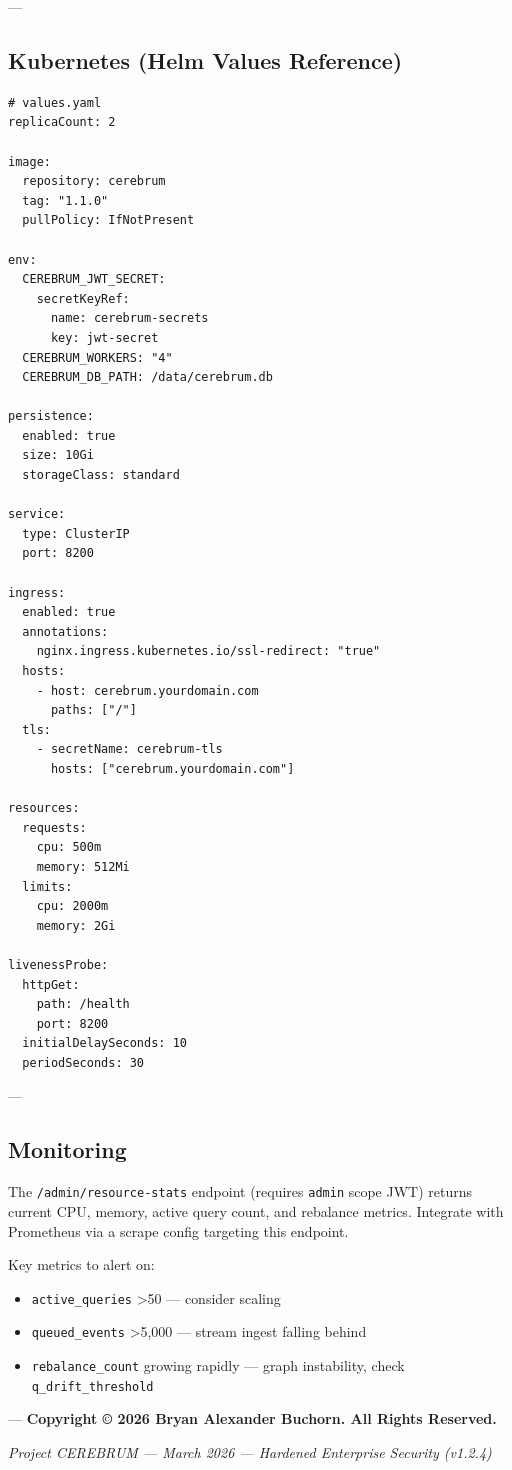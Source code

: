 \documentclass[11pt,article,oneside]{memoir}
\begin{document}
---

\subsection{Kubernetes (Helm Values Reference)}

\begin{lstlisting}
# values.yaml
replicaCount: 2

image:
  repository: cerebrum
  tag: "1.1.0"
  pullPolicy: IfNotPresent

env:
  CEREBRUM_JWT_SECRET:
    secretKeyRef:
      name: cerebrum-secrets
      key: jwt-secret
  CEREBRUM_WORKERS: "4"
  CEREBRUM_DB_PATH: /data/cerebrum.db

persistence:
  enabled: true
  size: 10Gi
  storageClass: standard

service:
  type: ClusterIP
  port: 8200

ingress:
  enabled: true
  annotations:
    nginx.ingress.kubernetes.io/ssl-redirect: "true"
  hosts:
    - host: cerebrum.yourdomain.com
      paths: ["/"]
  tls:
    - secretName: cerebrum-tls
      hosts: ["cerebrum.yourdomain.com"]

resources:
  requests:
    cpu: 500m
    memory: 512Mi
  limits:
    cpu: 2000m
    memory: 2Gi

livenessProbe:
  httpGet:
    path: /health
    port: 8200
  initialDelaySeconds: 10
  periodSeconds: 30
\end{lstlisting}

---

\subsection{Monitoring}

The \texttt{/admin/resource-stats} endpoint (requires \texttt{admin} scope JWT) returns current CPU, memory, active query count, and rebalance metrics. Integrate with Prometheus via a scrape config targeting this endpoint.

Key metrics to alert on:
\begin{itemize}
\item \texttt{active\_queries} \textgreater  50 — consider scaling
\item \texttt{queued\_events} \textgreater  5,000 — stream ingest falling behind
\item \texttt{rebalance\_count} growing rapidly — graph instability, check \texttt{q\_drift\_threshold}

\end{itemize}
---
\textbf{Copyright © 2026 Bryan Alexander Buchorn. All Rights Reserved.}


\vspace{3em}
\begin{center}
    \small \textit{Project CEREBRUM — March 2026 — Hardened Enterprise Security (v1.2.4)}
\end{center}
\end{document}
